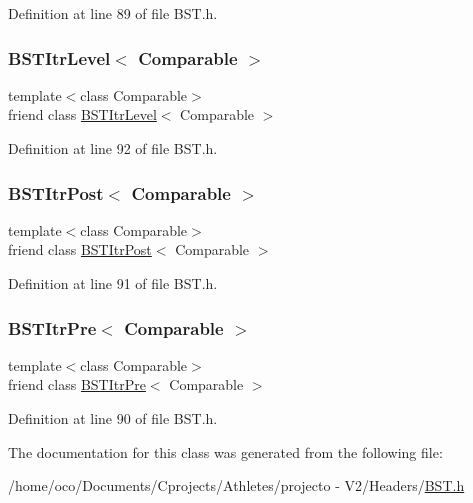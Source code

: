 Definition at line 89 of file B\+S\+T.\+h.

\hypertarget{class_b_s_t_a26ff00bc0d87069aed877f10fd3c80a8}{}\label{class_b_s_t_a26ff00bc0d87069aed877f10fd3c80a8} 
\subsubsection{\texorpdfstring{B\+S\+T\+Itr\+Level$<$ Comparable $>$}{BSTItrLevel< Comparable >}}
{\footnotesize\ttfamily template$<$class Comparable$>$ \\
friend class \hyperlink{class_b_s_t_itr_level}{B\+S\+T\+Itr\+Level}$<$ Comparable $>$\hspace{0.3cm}{\ttfamily [friend]}}



Definition at line 92 of file B\+S\+T.\+h.

\hypertarget{class_b_s_t_a5dc153694be266f6e772659486219da7}{}\label{class_b_s_t_a5dc153694be266f6e772659486219da7} 
\subsubsection{\texorpdfstring{B\+S\+T\+Itr\+Post$<$ Comparable $>$}{BSTItrPost< Comparable >}}
{\footnotesize\ttfamily template$<$class Comparable$>$ \\
friend class \hyperlink{class_b_s_t_itr_post}{B\+S\+T\+Itr\+Post}$<$ Comparable $>$\hspace{0.3cm}{\ttfamily [friend]}}



Definition at line 91 of file B\+S\+T.\+h.

\hypertarget{class_b_s_t_a45a55df6f11541416d4ea7684c575c1a}{}\label{class_b_s_t_a45a55df6f11541416d4ea7684c575c1a} 
\subsubsection{\texorpdfstring{B\+S\+T\+Itr\+Pre$<$ Comparable $>$}{BSTItrPre< Comparable >}}
{\footnotesize\ttfamily template$<$class Comparable$>$ \\
friend class \hyperlink{class_b_s_t_itr_pre}{B\+S\+T\+Itr\+Pre}$<$ Comparable $>$\hspace{0.3cm}{\ttfamily [friend]}}



Definition at line 90 of file B\+S\+T.\+h.



The documentation for this class was generated from the following file\+:\begin{DoxyCompactItemize}
\item 
/home/oco/\+Documents/\+Cprojects/\+Athletes/projecto -\/ V2/\+Headers/\hyperlink{_b_s_t_8h}{B\+S\+T.\+h}\end{DoxyCompactItemize}
